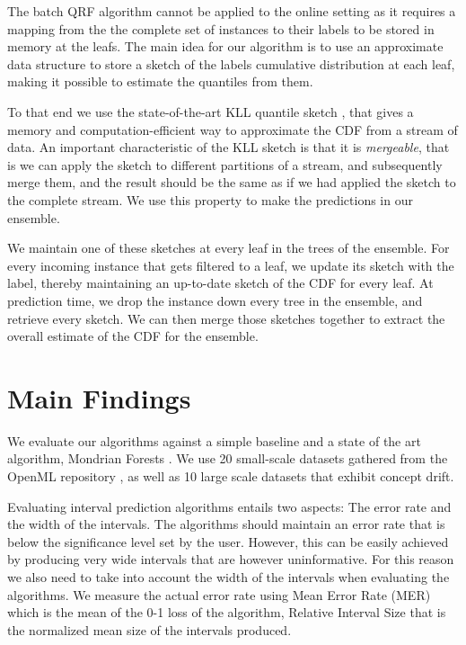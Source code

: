 The batch QRF algorithm cannot be applied to the online setting as it requires
a mapping from the the complete set of instances to their labels to be stored
in memory at the leafs. The main idea for our algorithm is to use an approximate data
structure to store a sketch of the labels cumulative distribution at each leaf,
making it possible to estimate the quantiles from them.

To that end we use the state-of-the-art KLL quantile sketch \cite{karnin2016kll},
that gives a memory and computation-efficient way to approximate the CDF from
a stream of data. An important characteristic of the KLL sketch is that it is
\emph{mergeable}, that is we can apply the sketch to different partitions of
a stream, and subsequently merge them, and the result should be the same
as if we had applied the sketch to the complete stream. We use this property
to make the predictions in our ensemble.

We maintain  one of these sketches at every leaf in the trees of the ensemble.
For every incoming instance that gets filtered to a leaf, we update its sketch
with the label, thereby maintaining an up-to-date sketch of the CDF for every
leaf. At prediction time, we drop the instance
down every tree in the ensemble, and retrieve every sketch.
We can then merge those sketches together to extract the overall estimate
of the CDF for the ensemble.

\section{Main Findings}
\label{sec:uncertain-trees-results}

We evaluate our algorithms against a simple baseline and a state of the art
algorithm, Mondrian Forests \cite{mondrian-forests-original}. We use 20 small-scale
datasets gathered from the OpenML repository \cite{vanschoren2013openml}, as well
as 10 large scale datasets that exhibit concept drift.

Evaluating interval prediction algorithms entails two aspects: The error rate
and the width of the intervals. The algorithms should maintain an error rate
that is below the significance level set by the user. However, this can be
easily achieved by producing very wide intervals that are however uninformative.
For this reason we also need to take into account the width of  the intervals when
evaluating the algorithms. We measure the actual error rate using Mean Error Rate (MER)
which is the mean of the 0-1 loss of the algorithm, Relative Interval Size that
is the normalized mean size of the intervals produced.

